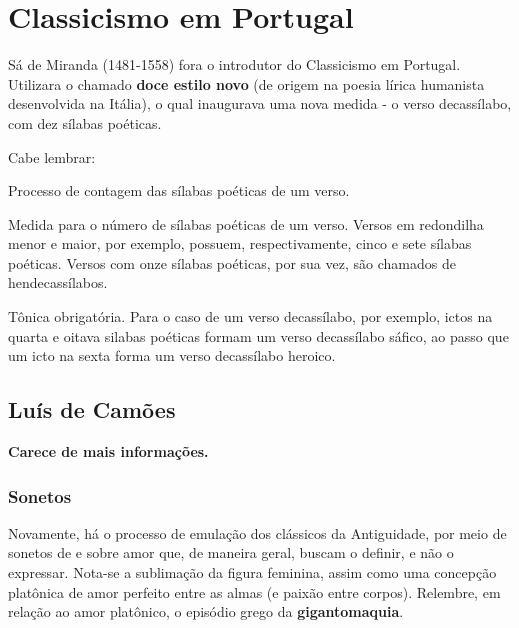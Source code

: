 
\chapter{Classicismo em Portugal}

Sá de Miranda (1481-1558) fora o introdutor do Classicismo em Portugal. Utilizara o chamado \textbf{doce estilo novo} (de origem na poesia lírica humanista desenvolvida na Itália), o qual inaugurava uma nova medida - o verso decassílabo, com dez sílabas poéticas. 

Cabe lembrar:

\begin{definition}[Escansão]
Processo de contagem das sílabas poéticas de um verso.
\end{definition}

\begin{definition}[Métrica]
Medida para o número de sílabas poéticas de um verso. Versos em redondilha menor e maior, por exemplo, possuem, respectivamente, cinco e sete sílabas poéticas. Versos com onze sílabas poéticas, por sua vez, são chamados de hendecassílabos.
\end{definition}

\begin{definition}[Icto]
Tônica obrigatória. Para o caso de um verso decassílabo, por exemplo, ictos na quarta e oitava silabas poéticas formam um verso decassílabo sáfico, ao passo que um icto na sexta forma um verso decassílabo heroico.
\end{definition}
	
\section{Luís de Camões}

\textbf{Carece de mais informações.}

\subsection{Sonetos}

Novamente, há o processo de emulação dos clássicos da Antiguidade, por meio de sonetos de e sobre amor que, de maneira geral, buscam o definir, e não o expressar. Nota-se a sublimação da figura feminina, assim como uma concepção platônica de amor perfeito entre as almas (e paixão entre corpos). Relembre, em relação ao amor platônico, o episódio grego da \textbf{gigantomaquia}.

